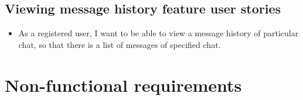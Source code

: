 \subsection{Viewing message history feature user stories}\label{subsec:viewing-message-history-feature-user-stories}
\begin{itemize}
    \item As a registered user, I want to be able to view a message history of particular chat, so that there is a list of messages of specified chat.
\end{itemize}


\section{Non-functional requirements}\label{sec:non-functional-requirements}